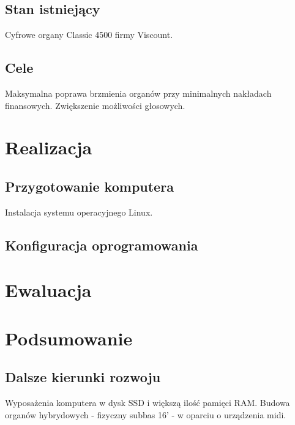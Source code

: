 \documentclass[11pt]{report}
\begin{document}
    \section{Stan istniejący}
    Cyfrowe organy Classic 4500 firmy Viscount.


    \section{Cele}
    Maksymalna poprawa brzmienia organów przy minimalnych nakładach finansowych.
    Zwiększenie możliwości głosowych.


    \chapter{Realizacja}


    \section{Przygotowanie komputera}
    Instalacja systemu operacyjnego Linux.

    \section{Konfiguracja oprogramowania}


    \chapter{Ewaluacja}


    \chapter{Podsumowanie}


    \section{Dalsze kierunki rozwoju}
    Wyposażenia komputera w dysk SSD i większą ilość pamięci RAM.
    Budowa organów hybrydowych - fizyczny subbas 16' - w oparciu o urządzenia midi.


    \newpage

    \nocite{*}
    \printbibliography[title={Bibliografia}]
\end{document}
